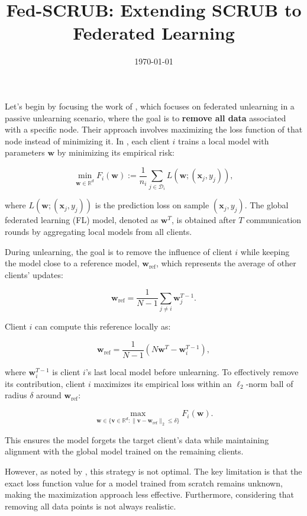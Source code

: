 \documentclass[a4paper,12pt]{article}
\title{Fed-SCRUB: Extending SCRUB to Federated Learning}
\author{}
\date{\today}
\begin{document}
\maketitle

Let's begin by focusing the work of \cite{halimi2022federated}, which focuses on federated unlearning in a passive unlearning scenario, where the goal is to \textbf{remove all data} associated with a specific node. Their approach involves maximizing the loss function of that node instead of minimizing it.
In \cite{halimi2022federated}, each client \( i \) trains a local model with parameters \( \mathbf{w} \) by minimizing its empirical risk:

\[
\min_{\mathbf{w} \in \mathbb{R}^d} F_i(\mathbf{w}) := \frac{1}{n_i} \sum_{j \in \mathcal{D}_i} L(\mathbf{w}; (\mathbf{x}_j, y_j)),
\]

where \( L(\mathbf{w}; (\mathbf{x}_j, y_j)) \) is the prediction loss on sample \( (\mathbf{x}_j, y_j) \). The global federated learning (FL) model, denoted as \( \mathbf{w}^T \), is obtained after \( T \) communication rounds by aggregating local models from all clients.

During unlearning, the goal is to remove the influence of client \( i \) while keeping the model close to a reference model, \( \mathbf{w}_{\text{ref}} \), which represents the average of other clients' updates:

\[
\mathbf{w}_{\text{ref}} = \frac{1}{N-1} \sum_{j \neq i} \mathbf{w}_j^{T-1}.
\]

Client \( i \) can compute this reference locally as:

\[
\mathbf{w}_{\text{ref}} = \frac{1}{N-1} \left( N\mathbf{w}^T - \mathbf{w}_i^{T-1} \right),
\]

where \( \mathbf{w}_i^{T-1} \) is client \( i \)’s last local model before unlearning. To effectively remove its contribution, client \( i \) maximizes its empirical loss within an \( \ell_2 \)-norm ball of radius \( \delta \) around \( \mathbf{w}_{\text{ref}} \):

\[
\max_{\mathbf{w} \in \{\mathbf{v} \in \mathbb{R}^d : \|\mathbf{v} - \mathbf{w}_{\text{ref}}\|_2 \leq \delta\}} F_i(\mathbf{w}).
\]

This ensures the model forgets the target client’s data while maintaining alignment with the global model trained on the remaining clients.


However, as noted by \cite{georgiev2024attributetodeletemachineunlearningdatamodel}, this strategy is not optimal. The key limitation is that the exact loss function value for a model trained from scratch remains unknown, making the maximization approach less effective. Furthermore, considering that removing all data points is not always realistic.
\end{document}
